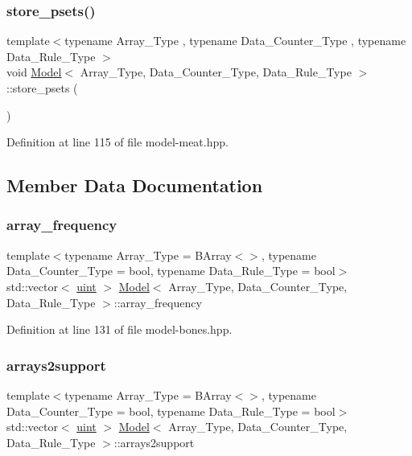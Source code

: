 \subsubsection{\texorpdfstring{store\+\_\+psets()}{store\_psets()}}
{\footnotesize\ttfamily template$<$typename Array\+\_\+\+Type , typename Data\+\_\+\+Counter\+\_\+\+Type , typename Data\+\_\+\+Rule\+\_\+\+Type $>$ \\
void \hyperlink{class_model}{Model}$<$ Array\+\_\+\+Type, Data\+\_\+\+Counter\+\_\+\+Type, Data\+\_\+\+Rule\+\_\+\+Type $>$\+::store\+\_\+psets (\begin{DoxyParamCaption}{ }\end{DoxyParamCaption})\hspace{0.3cm}{\ttfamily [inline]}}



Definition at line 115 of file model-\/meat.\+hpp.



\subsection{Member Data Documentation}
\mbox{\label{class_model_a8470b5bb905b692f24a3e5197f8680ed}} 
\subsubsection{\texorpdfstring{array\+\_\+frequency}{array\_frequency}}
{\footnotesize\ttfamily template$<$typename Array\+\_\+\+Type = B\+Array$<$$>$, typename Data\+\_\+\+Counter\+\_\+\+Type = bool, typename Data\+\_\+\+Rule\+\_\+\+Type = bool$>$ \\
std\+::vector$<$ \hyperlink{typedefs_8hpp_a91ad9478d81a7aaf2593e8d9c3d06a14}{uint} $>$ \hyperlink{class_model}{Model}$<$ Array\+\_\+\+Type, Data\+\_\+\+Counter\+\_\+\+Type, Data\+\_\+\+Rule\+\_\+\+Type $>$\+::array\+\_\+frequency}



Definition at line 131 of file model-\/bones.\+hpp.

\mbox{\label{class_model_a038858e9cd8e396412c3867113a149e7}} 
\subsubsection{\texorpdfstring{arrays2support}{arrays2support}}
{\footnotesize\ttfamily template$<$typename Array\+\_\+\+Type = B\+Array$<$$>$, typename Data\+\_\+\+Counter\+\_\+\+Type = bool, typename Data\+\_\+\+Rule\+\_\+\+Type = bool$>$ \\
std\+::vector$<$ \hyperlink{typedefs_8hpp_a91ad9478d81a7aaf2593e8d9c3d06a14}{uint} $>$ \hyperlink{class_model}{Model}$<$ Array\+\_\+\+Type, Data\+\_\+\+Counter\+\_\+\+Type, Data\+\_\+\+Rule\+\_\+\+Type $>$\+::arrays2support}



